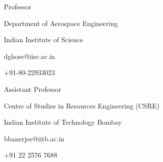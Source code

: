 
\begin{minipage}[t]{.5\linewidth}
  \raggedright
  \begin{description}
    \item[Debasish Ghose]
    \item{Professor}
    \item{Department of Aerospace Engineering}
    \item{Indian Institute of Science}
    \item{dghose@iisc.ac.in}
    \item{+91-80-22933023}
  \end{description}
\end{minipage}%
\hfil
\begin{minipage}[t]{.5\linewidth}
  \raggedright
  \begin{description}
    \item[Biplab Banerjee]
    \item{Assistant Professor}
    \item{Centre of Studies in Resources Engineering (CSRE)}
    \item{Indian Institute of Technology Bombay}
    \item{bbanerjee@iitb.ac.in}
    \item{+91 22 2576 7688}
  \end{description}
\end{minipage}%
\hfil
